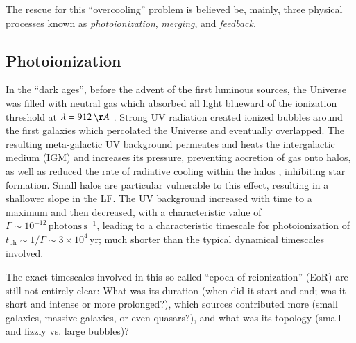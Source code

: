 \documentclass[useAMS,usenatbib,bibyear]{aa}
\begin{document}
The rescue for this ``overcooling'' problem is believed be, mainly, three physical processes known as \emph{photoionization}, \emph{merging}, and \emph{feedback}.

\subsection{Photoionization}
\label{sec:reionization}

In the ``dark ages'', before the advent of the first luminous sources, the Universe was filled with neutral gas which absorbed all light blueward of the ionization threshold at $\lambda = 912\,{\AA}$ \citep{Gnedin2000,Barkana2001}.
Strong UV radiation created ionized bubbles around the first galaxies which percolated the Universe and eventually overlapped.
The resulting meta-galactic UV background permeates and heats the intergalactic medium (IGM) and increases its pressure, preventing accretion of gas onto halos, as well as reduced the rate of radiative cooling within the halos \citep{Benson2002}, inhibiting star formation.
Small halos are particular vulnerable to this effect, resulting in a shallower slope in the LF.
The UV background increased with time to a maximum and then decreased, with a characteristic value of $\Gamma\sim10^{-12}\,\mathrm{photons}\,\mathrm{s}^{-1}$, leading to a characteristic timescale for photoionization of $t_\mathrm{ph} \sim 1/\Gamma \sim 3\times10^4\,\mathrm{yr}$; much shorter than the typical dynamical timescales involved.

The exact timescales involved in this so-called ``epoch of reionization'' (EoR) are still not entirely clear:
What was its duration (when did it start and end; was it short and intense or more prolonged?), which sources contributed more (small galaxies, massive galaxies, or even quasars?),
and what was its topology (small and fizzly vs. large bubbles)?
\end{document}
